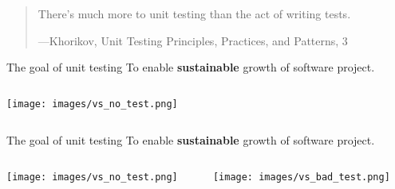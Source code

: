 \documentclass[english,10pt,aspectratio=169]{beamer}
\title{\large\presentationtitle}
\author{\textbf{
	<Name>
}}
\date{}
\begin{document}
\begin{frame}
	\titlepage
\end{frame}

\begin{frame}
	\begin{quote}
		There's much more to unit testing than the act of writing tests.
		\begin{flushright}
			\tiny{---Khorikov, \textup{Unit Testing Principles, Practices, and Patterns}, 3}
		\end{flushright}
	\end{quote}
\end{frame}

\begin{frame}{The goal of unit testing}
	To enable \textbf{sustainable} growth of software project.
	\begin{columns}[T]
		\begin{column}{0.5\textwidth}
			\texttt{[image: images/vs\_no\_test.png]}
		\end{column}
		\begin{column}{0.5\textwidth}
		\end{column}
	\end{columns}
\end{frame}

\begin{frame}{The goal of unit testing}
	To enable \textbf{sustainable} growth of software project.
	\begin{columns}[T]
		\begin{column}{0.5\textwidth}
			\texttt{[image: images/vs\_no\_test.png]}
		\end{column}
		\begin{column}{0.5\textwidth}
			\texttt{[image: images/vs\_bad\_test.png]}
		\end{column}
	\end{columns}
\end{frame}
\end{document}
